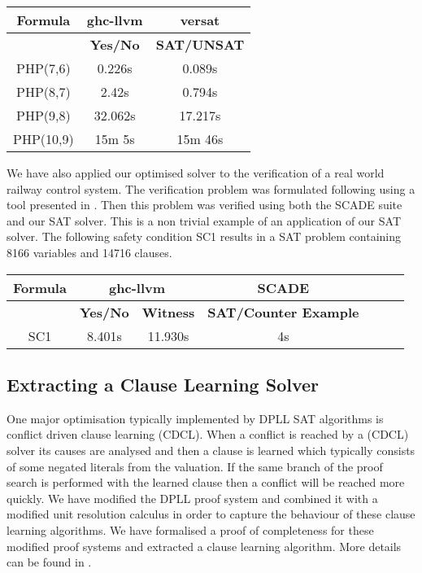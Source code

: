 \documentclass{article}
\begin{document}
\begin{center}
{\small
\begin{tabular}{|c||c|c|}
  \hline
  \textbf{Formula} & \textbf{\textbf{ghc-llvm}}  & \textbf{versat} \\ \hline 
  &  \textbf{Yes/No} & \textbf{SAT/UNSAT}  \\ \hline
  PHP(7,6) &   0.226s & 0.089s \\ \hline
  PHP(8,7) &   2.42s & 0.794s \\ \hline
  PHP(9,8) &   32.062s & 17.217s \\ \hline
  PHP(10,9) &  15m 5s & 15m 46s \\ \hline
\end{tabular}
}
\end{center}
%
\medskip 
We have also applied our optimised solver to the verification of a real world railway control system. The verification problem was formulated following \cite{MS00} using a tool presented in \cite{KK08}. Then this problem was verified using both the SCADE \cite{GS06} suite and our SAT solver. This is a non trivial example of an application of our SAT solver. The following safety condition SC1 results in a SAT problem containing 8166 variables and 14716 clauses. \medskip  
%
\begin{comment}
\begin{align*}
& SC1 =  (\neg D \vee R) \vee UEC \\
\end{align*}
\end{comment}
%
\begin{center}
{\small
\begin{tabular}{|c||c|c||c|c||c|c|}
  \hline
  \textbf{Formula} & \multicolumn{2}{|c||}{\textbf{ghc-llvm}}   & \textbf{SCADE} \\ \hline 
  &  \textbf{Yes/No} & \textbf{Witness} & \textbf{SAT/Counter Example}  \\ \hline
  SC1 & 8.401s & 11.930s &  4s \\ \hline
\end{tabular}
}
\end{center}
%

\subsection*{Extracting a Clause Learning Solver}
One major optimisation typically implemented by DPLL SAT algorithms is conflict driven clause learning (CDCL). When a conflict is reached by a (CDCL) solver its causes are analysed and then a clause is learned which typically consists of some negated literals from the valuation. If the same branch of the proof search is performed with the learned clause then a conflict will be reached more quickly.  We have modified the DPLL proof system and combined it with a modified unit resolution calculus in order to capture the behaviour of these clause learning algorithms. We have formalised a proof of completeness for these modified proof systems and extracted a clause learning algorithm. More details can be found in \cite{AL13c}.
\end{document}
